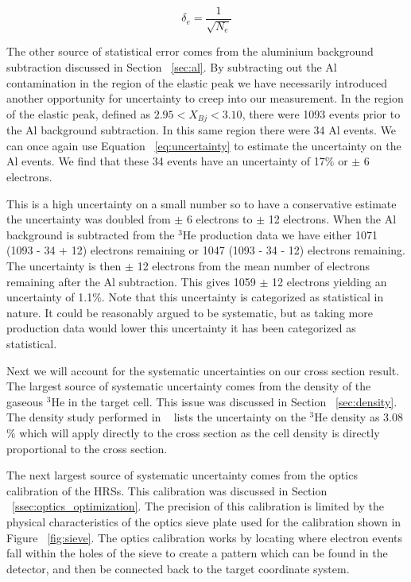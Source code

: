 \begin{equation} \label{eq:uncertainty}
	\delta_e = \frac{1}{\sqrt{N_e}}
\end{equation}

The other source of statistical error comes from the aluminium background subtraction discussed in Section ~\ref{sec:al}. By subtracting out the Al contamination in the region of the elastic peak we have necessarily introduced another opportunity for uncertainty to creep into our measurement. In the region of the elastic peak, defined as $2.95<X_{Bj}<3.10$, there were 1093 events prior to the Al background subtraction. In this same region there were 34 Al events. We can once again use Equation ~\ref{eq:uncertainty} to estimate the uncertainty on the Al events. We find that these 34 events have an uncertainty of 17$\%$ or $\pm$ 6 electrons. 

This is a high uncertainty on a small number so to have a conservative estimate the uncertainty was doubled from $\pm$ 6 electrons to $\pm$ 12 electrons. When the Al background is subtracted from the $^3$He production data we have either 1071 (1093 - 34 + 12) electrons remaining or 1047 (1093 - 34 - 12) electrons remaining. The uncertainty is then $\pm$ 12 electrons from the mean number of electrons remaining after the Al subtraction. This gives 1059 $\pm$ 12 electrons yielding an uncertainty of 1.1$\%$. Note that this uncertainty is categorized as statistical in nature. It could be reasonably argued to be systematic, but as taking more production data would lower this uncertainty it has been categorized as statistical.

Next we will account for the systematic uncertainties on our cross section result. The largest source of systematic uncertainty comes from the density of the gaseous $^3$He in the target cell. This issue was discussed in Section ~\ref{sec:density}. The density study performed in ~\cite{density} lists the uncertainty on the  $^3$He density as 3.08$\%$ which will apply directly to the cross section as the cell density is directly proportional to the cross section.

The next largest source of systematic uncertainty comes from the optics calibration of the HRSs. This calibration was discussed in Section ~\ref{ssec:optics_optimization}. The precision of this calibration is limited by the physical characteristics of the optics sieve plate used for the calibration shown in Figure ~\ref{fig:sieve}. The optics calibration works by locating where electron events fall within the holes of the sieve to create a pattern which can be found in the detector, and then be connected back to the target coordinate system. 

